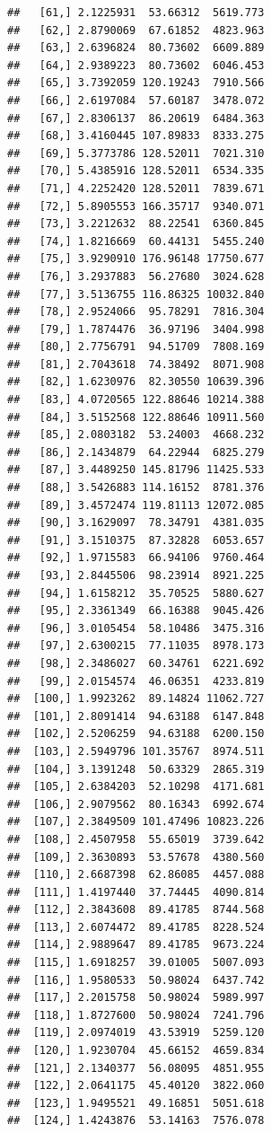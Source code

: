 \documentclass[article]{jss}\usepackage[]{graphicx}\usepackage[]{xcolor}
\makeatletter
\newenvironment{kframe}{%
 \def\at@end@of@kframe{}%
 \ifinner\ifhmode%
  \def\at@end@of@kframe{\end{minipage}}%
  \begin{minipage}{\columnwidth}%
 \fi\fi%
 \def\FrameCommand##1{\hskip\@totalleftmargin \hskip-\fboxsep
 \colorbox{shadecolor}{##1}\hskip-\fboxsep
     \hskip-\linewidth \hskip-\@totalleftmargin \hskip\columnwidth}%
 \MakeFramed {\advance\hsize-\width
   \@totalleftmargin\z@ \linewidth\hsize
   \@setminipage}}%
 {\par\unskip\endMakeFramed%
 \at@end@of@kframe}
\newenvironment{knitrout}{}{} %
\makeatother
\begin{document}
\begin{knitrout}
\begin{kframe}
\begin{verbatim}
##   [61,] 2.1225931  53.66312  5619.773
##   [62,] 2.8790069  67.61852  4823.963
##   [63,] 2.6396824  80.73602  6609.889
##   [64,] 2.9389223  80.73602  6046.453
##   [65,] 3.7392059 120.19243  7910.566
##   [66,] 2.6197084  57.60187  3478.072
##   [67,] 2.8306137  86.20619  6484.363
##   [68,] 3.4160445 107.89833  8333.275
##   [69,] 5.3773786 128.52011  7021.310
##   [70,] 5.4385916 128.52011  6534.335
##   [71,] 4.2252420 128.52011  7839.671
##   [72,] 5.8905553 166.35717  9340.071
##   [73,] 3.2212632  88.22541  6360.845
##   [74,] 1.8216669  60.44131  5455.240
##   [75,] 3.9290910 176.96148 17750.677
##   [76,] 3.2937883  56.27680  3024.628
##   [77,] 3.5136755 116.86325 10032.840
##   [78,] 2.9524066  95.78291  7816.304
##   [79,] 1.7874476  36.97196  3404.998
##   [80,] 2.7756791  94.51709  7808.169
##   [81,] 2.7043618  74.38492  8071.908
##   [82,] 1.6230976  82.30550 10639.396
##   [83,] 4.0720565 122.88646 10214.388
##   [84,] 3.5152568 122.88646 10911.560
##   [85,] 2.0803182  53.24003  4668.232
##   [86,] 2.1434879  64.22944  6825.279
##   [87,] 3.4489250 145.81796 11425.533
##   [88,] 3.5426883 114.16152  8781.376
##   [89,] 3.4572474 119.81113 12072.085
##   [90,] 3.1629097  78.34791  4381.035
##   [91,] 3.1510375  87.32828  6053.657
##   [92,] 1.9715583  66.94106  9760.464
##   [93,] 2.8445506  98.23914  8921.225
##   [94,] 1.6158212  35.70525  5880.627
##   [95,] 2.3361349  66.16388  9045.426
##   [96,] 3.0105454  58.10486  3475.316
##   [97,] 2.6300215  77.11035  8978.173
##   [98,] 2.3486027  60.34761  6221.692
##   [99,] 2.0154574  46.06351  4233.819
##  [100,] 1.9923262  89.14824 11062.727
##  [101,] 2.8091414  94.63188  6147.848
##  [102,] 2.5206259  94.63188  6200.150
##  [103,] 2.5949796 101.35767  8974.511
##  [104,] 3.1391248  50.63329  2865.319
##  [105,] 2.6384203  52.10298  4171.681
##  [106,] 2.9079562  80.16343  6992.674
##  [107,] 2.3849509 101.47496 10823.226
##  [108,] 2.4507958  55.65019  3739.642
##  [109,] 2.3630893  53.57678  4380.560
##  [110,] 2.6687398  62.86085  4457.088
##  [111,] 1.4197440  37.74445  4090.814
##  [112,] 2.3843608  89.41785  8744.568
##  [113,] 2.6074472  89.41785  8228.524
##  [114,] 2.9889647  89.41785  9673.224
##  [115,] 1.6918257  39.01005  5007.093
##  [116,] 1.9580533  50.98024  6437.742
##  [117,] 2.2015758  50.98024  5989.997
##  [118,] 1.8727600  50.98024  7241.796
##  [119,] 2.0974019  43.53919  5259.120
##  [120,] 1.9230704  45.66152  4659.834
##  [121,] 2.1340377  56.08095  4851.955
##  [122,] 2.0641175  45.40120  3822.060
##  [123,] 1.9495521  49.16851  5051.618
##  [124,] 1.4243876  53.14163  7576.078

\end{verbatim}
\end{kframe}
\end{knitrout}
\end{document}
